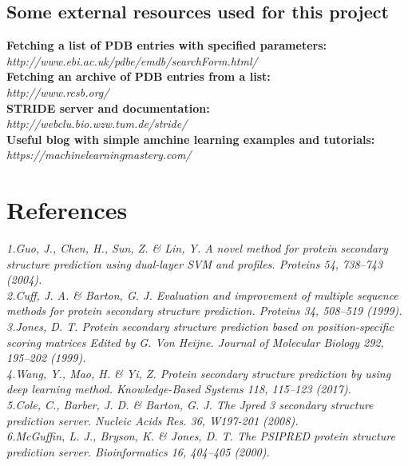 \documentclass[12pt]{article}
\begin{document}
\subsection{Some external resources used for this project}

\textbf{Fetching a list of PDB entries with specified parameters:}\\
\emph{http://www.ebi.ac.uk/pdbe/emdb/searchForm.html/ }\\

\noindent \textbf{Fetching an archive of PDB entries from a list:}\\
\emph{http://www.rcsb.org/} \\

\noindent \textbf{STRIDE server and documentation:}\\
\emph{http://webclu.bio.wzw.tum.de/stride/}\\

\noindent \textbf{Useful blog with simple amchine learning examples and tutorials:}\\
\emph{https://machinelearningmastery.com/}

\section{References}

\emph{1.Guo, J., Chen, H., Sun, Z. \& Lin, Y. A novel method for protein secondary structure prediction using dual-layer SVM and profiles. Proteins 54, 738–743 (2004).\\[0.2cm]
 2.Cuff, J. A. \& Barton, G. J. Evaluation and improvement of multiple sequence methods for protein secondary structure prediction. Proteins 34, 508–519 (1999).\\[0.2cm]
 3.Jones, D. T. Protein secondary structure prediction based on position-specific scoring matrices Edited by G. Von Heijne. Journal of Molecular Biology 292, 195–202 (1999).\\[0.2cm]
 4.Wang, Y., Mao, H. \& Yi, Z. Protein secondary structure prediction by using deep learning method. Knowledge-Based Systems 118, 115–123 (2017).\\[0.2cm]
 5.Cole, C., Barber, J. D. \& Barton, G. J. The Jpred 3 secondary structure prediction  server. Nucleic Acids Res. 36, W197-201 (2008).\\[0.2cm]
6.McGuffin, L. J., Bryson, K. \& Jones, D. T. The PSIPRED protein structure prediction server. Bioinformatics 16, 404–405 (2000).
}
\end{document}
